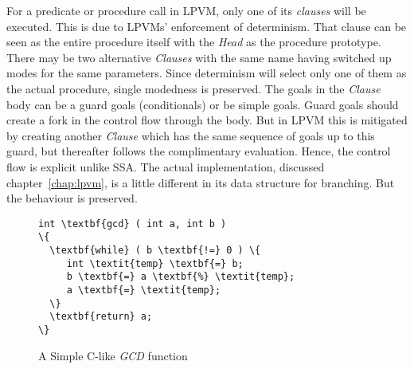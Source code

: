 For a predicate or procedure call in LPVM, only one of its \textit{clauses}
will be executed. This is due to LPVMs' enforcement of determinism. That clause
can be seen as the entire procedure itself with the \textit{Head} as the
procedure prototype. There may be two alternative \textit{Clauses} with the
same name having switched up modes for the same parameters. Since determinism
will select only one of them as the actual procedure, single modedness is
preserved. The goals in the \textit{Clause} body can be a guard goals
(conditionals) or be simple goals. Guard goals should create a fork in the
control flow through the body. But in LPVM this is mitigated by creating
another \textit{Clause} which has the same sequence of goals up to this guard,
but thereafter follows the complimentary evaluation. Hence, the control flow is
explicit unlike SSA. The actual implementation, discussed
chapter~\ref{chap:lpvm}, is a little different in its data structure for
branching. But the behaviour is preserved.

\begin{figure}
  \begin{center}
  \begin{minipage}{4cm}
\begin{Verbatim}[commandchars=\\\{\},fontsize=\small]
int \textbf{gcd} ( int a, int b ) 
\{
  \textbf{while} ( b \textbf{!=} 0 ) \{
     int \textit{temp} \textbf{=} b; 
     b \textbf{=} a \textbf{%} \textit{temp};
     a \textbf{=} \textit{temp};
  \}
  \textbf{return} a;
\}
\end{Verbatim}
  \end{minipage}
\end{center}
\caption{A Simple C-like \textit{GCD} function}
  \label{fig:gcd}
\end{figure}


